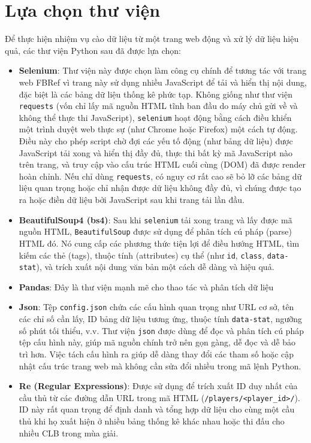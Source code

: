 \documentclass[12pt, a4paper]{report}
\begin{document}
\section{Lựa chọn thư viện}
Để thực hiện nhiệm vụ cào dữ liệu từ một trang web động và xử lý dữ liệu hiệu quả, các thư viện Python sau đã được lựa chọn:
\begin{itemize}
\renewcommand{\labelitemi}{}
    \item \textbf{Selenium}: Thư viện này được chọn làm công cụ chính để tương tác với trang web FBRef vì trang này sử dụng nhiều JavaScript để tải và hiển thị nội dung, đặc biệt là các bảng dữ liệu thống kê phức tạp. Không giống như thư viện \texttt{requests} (vốn chỉ lấy mã nguồn HTML tĩnh ban đầu do máy chủ gửi về và không thể thực thi JavaScript), \texttt{selenium} hoạt động bằng cách điều khiển một trình duyệt web thực sự (như Chrome hoặc Firefox) một cách tự động. Điều này cho phép script chờ đợi các yếu tố động (như bảng dữ liệu) được JavaScript tải xong và hiển thị đầy đủ, thực thi bất kỳ mã JavaScript nào trên trang, và truy cập vào cấu trúc HTML cuối cùng (DOM) đã được render hoàn chỉnh. Nếu chỉ dùng \texttt{requests}, có nguy cơ rất cao sẽ bỏ lỡ các bảng dữ liệu quan trọng hoặc chỉ nhận được dữ liệu không đầy đủ, vì chúng được tạo ra hoặc điền dữ liệu bởi JavaScript sau khi trang tải lần đầu. 
    \item \textbf{BeautifulSoup4 (bs4)}: Sau khi \texttt{selenium} tải xong trang và lấy được mã nguồn HTML, \texttt{BeautifulSoup} được sử dụng để phân tích cú pháp (parse) HTML đó. 
    Nó cung cấp các phương thức tiện lợi để điều hướng HTML, tìm kiếm các thẻ (tags), thuộc tính (attributes) cụ thể (như \texttt{id}, \texttt{class}, \texttt{data-stat}), và trích xuất nội dung văn bản một cách dễ dàng và hiệu quả. 
    \item \textbf{Pandas}: Đây là thư viện mạnh mẽ cho thao tác và phân tích dữ liệu
    \item \textbf{Json}: Tệp \texttt{config.json} chứa các cấu hình quan trọng như URL cơ sở, tên các chỉ số cần lấy, ID bảng dữ liệu tương ứng, thuộc tính \texttt{data-stat}, ngưỡng số phút tối thiểu, v.v. Thư viện \texttt{json} được dùng để đọc và phân tích cú pháp tệp cấu hình này, giúp mã nguồn chính trở nên gọn gàng, dễ đọc và dễ bảo trì hơn. Việc tách cấu hình ra giúp dễ dàng thay đổi các tham số hoặc cập nhật cấu trúc trang web mà không cần sửa đổi nhiều trong mã lệnh Python. 
    \item \textbf{Re (Regular Expressions)}: Được sử dụng để trích xuất ID duy nhất của cầu thủ từ các đường dẫn URL trong mã HTML (\texttt{/players/<player\_id>/}). ID này rất quan trọng để định danh và tổng hợp dữ liệu cho cùng một cầu thủ khi họ xuất hiện ở nhiều bảng thống kê khác nhau hoặc thi đấu cho nhiều CLB trong mùa giải. 

\end{itemize}
\end{document}
